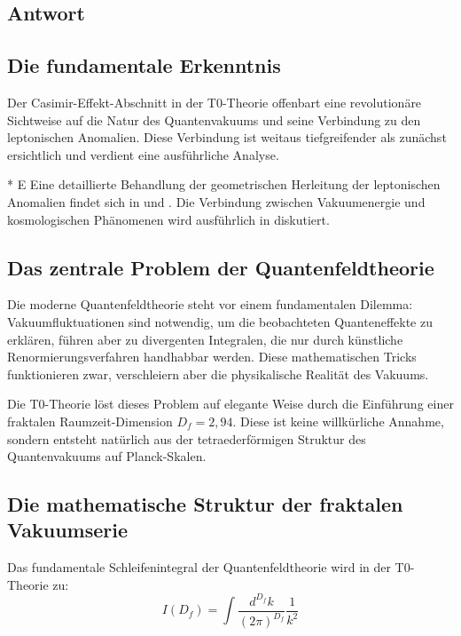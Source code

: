 \documentclass[12pt,a4paper]{article}
\theoremstyle{remark}
\newenvironment{answer}{\subsection*{Antwort}}{\vspace{1em}}
\begin{document}
\begin{answer}
	\subsection{Die fundamentale Erkenntnis}
	
	Der Casimir-Effekt-Abschnitt in der T0-Theorie offenbart eine revolutionäre Sichtweise auf die Natur des Quantenvakuums und seine Verbindung zu den leptonischen Anomalien. Diese Verbindung ist weitaus tiefgreifender als zunächst ersichtlich und verdient eine ausführliche Analyse.
	
	\begin{important}[title=Weiterführende Dokumentation]
		* E Eine detaillierte Behandlung der geometrischen Herleitung der leptonischen Anomalien findet sich in \cite{pascher_muon_g2_2025} und \cite{pascher_formeln_energiebasiert_2025}. Die Verbindung zwischen Vakuumenergie und kosmologischen Phänomenen wird ausführlich in \cite{pascher_cosmos_2025} diskutiert.
	\end{important}
	
	\subsection{Das zentrale Problem der Quantenfeldtheorie}
	
	Die moderne Quantenfeldtheorie steht vor einem fundamentalen Dilemma: Vakuumfluktuationen sind notwendig, um die beobachteten Quanteneffekte zu erklären, führen aber zu divergenten Integralen, die nur durch künstliche Renormierungsverfahren handhabbar werden. Diese mathematischen Tricks funktionieren zwar, verschleiern aber die physikalische Realität des Vakuums.
	
	Die T0-Theorie löst dieses Problem auf elegante Weise durch die Einführung einer fraktalen Raumzeit-Dimension $D_f = 2{,}94$. Diese ist keine willkürliche Annahme, sondern entsteht natürlich aus der tetraederförmigen Struktur des Quantenvakuums auf Planck-Skalen.
	
	\subsection{Die mathematische Struktur der fraktalen Vakuumserie}
	
	Das fundamentale Schleifenintegral der Quantenfeldtheorie wird in der T0-Theorie zu:
	\begin{equation}
		I(D_f) = \int \frac{d^{D_f} k}{(2\pi)^{D_f}} \frac{1}{k^2}
	\end{equation}
	

\end{answer}
\end{document}
